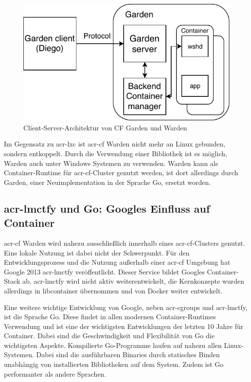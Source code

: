 \begin{figure}[h]
	\begin{center}
		\includegraphics{bilder/cf-warden-arch.pdf}
		\caption{Client-Server-Architektur von CF Garden und Warden \citep{CFGardenbackEndsContainerSecurityDebugging}}
		\label{fig:wardenArch}
	\end{center}
\end{figure}

Im Gegensatz zu \gls{acr-lxc} ist \gls{acr-cf} Warden nicht mehr an Linux gebunden, sondern entkoppelt. Durch die Verwendung einer Bibliothek ist es möglich, Warden auch unter Windows Systemen zu verwenden. Warden kann als Container-Runtime für \gls{acr-cf}-Cluster genutzt werden, ist dort allerdings durch Garden, einer Neuimplementation in der Sprache Go, ersetzt worden.

\subsection{\gls{acr-lmctfy} und Go: Googles Einfluss auf Container}
\label{sec:geschichteLMCTFY}
\gls{acr-cf} Warden wird nahezu ausschließlich innerhalb eines \gls{acr-cf}-Clusters genutzt. Eine lokale Nutzung ist dabei nicht der Schwerpunkt. Für den Entwicklungsprozess und  die Nutzung außerhalb einer \gls{acr-cf} Umgebung hat Google 2013 \gls{acr-lmctfy} veröffentlicht. Dieser Service bildet Googles Container-Stack ab. \gls{acr-lmctfy} wird nicht aktiv weiterentwickelt, die Kernkonzepte wurden allerdings in libcontainer übernommen und von Docker weiter entwickelt.

Eine weitere wichtige Entwicklung von Google, neben \glspl{acr-cgroup} und \gls{acr-lmctfy}, ist die Sprache Go. Diese findet in allen modernen Container-Runtimes Verwendung und ist eine der wichtigsten Entwicklungen der letzten 10 Jahre für Container. Dabei sind die Geschwindigkeit und Flexibilität von Go die wichtigsten Aspekte. Kompilierte Go-Programme laufen auf nahezu allen Linux-Systemen. Dabei sind die ausführbaren Binaries durch statisches Binden unabhängig von installierten Bibliotheken auf dem System. Zudem ist Go performanter als andere Sprachen.

